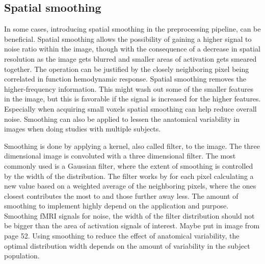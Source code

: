 \subsection{Spatial smoothing}

In some cases, introducing spatial smoothing in the preprocessing pipeline, can be beneficial. Spatial smoothing allows the possibility of gaining a higher signal to noise ratio within the image, though with the consequence of a decrease in spatial resolution as the image gets blurred and smaller areas of activation gets smeared together. The operation can be justified by the closely neighboring pixel being correlated in function hemodynamic response. Spatial smoothing removes the higher-frequency information. This might wash out some of the smaller features in the image, but this is favorable if the signal is increased for the higher features. Especially when acquiring small voxels spatial smoothing can help reduce overall noise. Smoothing can also be applied to lessen the anatomical variability in images when doing studies with multiple subjects.\cite{Poldrack2011}

Smoothing is done by applying a kernel, also called filter, to the image. The three dimensional image is convoluted with a three dimensional filter. The most commonly used is a Gaussian filter, where the extent of smoothing is controlled by the width of the distribution. The filter works by for each pixel calculating a new value based on a weighted average of the neighboring pixels, where the ones closest contributes the most to and those further away less. The amount of smoothing to implement highly depend on the application and purpose. Smoothing fMRI signals for noise, the width of the filter distribution should not be bigger than the area of activation signals of interest. 
Maybe put in image from page 52.
Using smoothing to reduce the effect of anatomical variability, the optimal distribution width depends on the amount of variability in the subject population. \cite{Poldrack2011}
  









